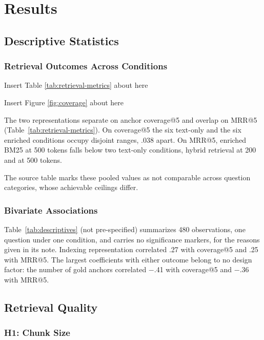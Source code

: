 \chapter{Results}

\section{Descriptive Statistics}

\subsection{Retrieval Outcomes Across Conditions}

{\centering\noindent Insert Table \ref{tab:retrieval-metrics} about here\par}

{\centering\noindent Insert Figure \ref{fig:coverage} about here\par}

The two representations separate on anchor coverage@5 and overlap on MRR@5
(Table~\ref{tab:retrieval-metrics}). On coverage@5 the six text-only and the six
enriched conditions occupy disjoint ranges, .038 apart. On MRR@5, enriched
BM25 at 500 tokens falls below two text-only conditions, hybrid retrieval at
200 and at 500 tokens.

The source table marks these pooled values as not comparable across question
categories, whose achievable ceilings differ.

\subsection{Bivariate Associations}

Table~\ref{tab:descriptives} (not pre-specified) summarizes 480 observations,
one question under one condition, and carries no significance markers, for the
reasons given in its note. Indexing representation correlated .27 with
coverage@5 and .25 with MRR@5. The largest coefficients with either outcome belong
to no design factor: the number of gold anchors correlated $-$.41 with coverage@5 and
$-$.36 with MRR@5.

\section{Retrieval Quality}

\subsection{H1: Chunk Size}

